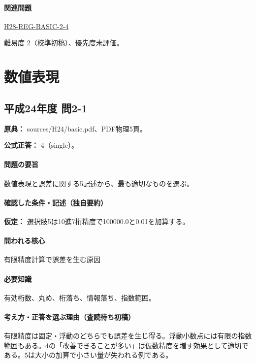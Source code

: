 \paragraph{関連問題} \hyperref[q:h28-reg-basic-2-4]{H28-REG-BASIC-2-4}

\par 難易度 2（校準初稿）、優先度未評価。

\section{数値表現}

\subsection{平成24年度 問2-1}
\label{q:h24-reg-basic-2-1}

\noindent\textbf{原典：} sources/H24/basic.pdf、PDF物理5頁。

\textbf{公式正答：} 4（single）。

\paragraph{問題の要旨} 数値表現と誤差に関する5記述から、最も適切なものを選ぶ。

\paragraph{確認した条件・記述（独自要約）}\mbox{}\par

\noindent\textbf{仮定：} 選択肢5は10進7桁精度で100000.0と0.01を加算する。\par

\paragraph{問われる核心} 有限精度計算で誤差を生む原因

\paragraph{必要知識} 有効桁数、丸め、桁落ち、情報落ち、指数範囲。

\paragraph{考え方・正答を選ぶ理由（査読待ち初稿）} 有限精度は固定・浮動のどちらでも誤差を生じ得る。浮動小数点には有限の指数範囲もある。4の「改善できることが多い」は仮数精度を増す効果として適切である。5は大小の加算で小さい量が失われる例である。


